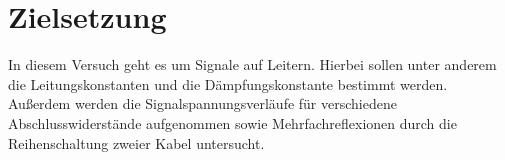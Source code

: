 \section{Zielsetzung}
\label{sec:zielsetzung}

In diesem Versuch geht es um Signale auf Leitern. Hierbei sollen unter anderem die Leitungskonstanten und die Dämpfungskonstante bestimmt werden. Außerdem werden die Signalspannungsverläufe für verschiedene Abschlusswiderstände aufgenommen sowie Mehrfachreflexionen durch die Reihenschaltung zweier Kabel untersucht.
